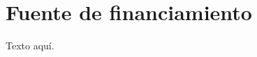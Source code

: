 \documentclass[12pt]{report}
\begin{document}
\section{Fuente de financiamiento}
Texto aquí.






\newpage



\end{document}
